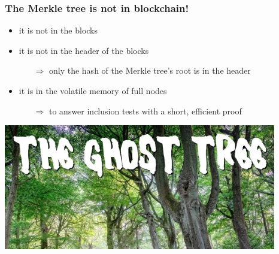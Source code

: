 \documentclass[11pt]{beamer}  %
\begin{document}
\begin{frame}\frametitle{The Merkle tree is not in blockchain!}

  \begin{greenbox}{}
    \begin{itemize}
    \item it is not in the blocks
    \item it is not in the header of the blocks
      \begin{itemize}
      \item[$\Rightarrow$] only the hash of the Merkle tree's root is in the header
      \end{itemize}
    \item it is in the volatile memory of full nodes
      \begin{itemize}
      \item[$\Rightarrow$] to answer inclusion tests with a short, efficient proof
      \end{itemize}      
    \end{itemize}
  \end{greenbox}

  \bigskip

  \begin{center}
    \includegraphics[scale=0.5,clip=false]{pictures/ghost-tree.png}
  \end{center}

\end{frame}
\end{document}
